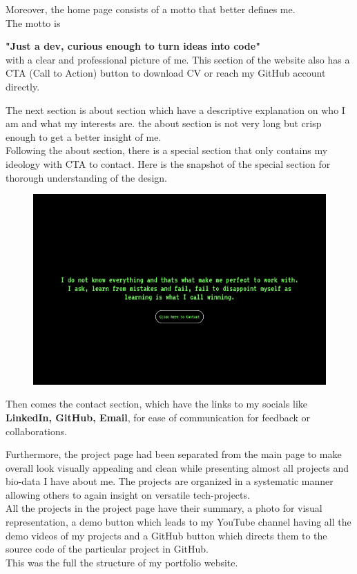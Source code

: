 \documentclass{report}
\begin{document}
Moreover, the home page consists of a motto that better defines me.\\
The motto is \par {\bf "Just a dev, curious enough to turn ideas into code"}\\ with a clear and professional picture of me. This section of the website also has a CTA (Call to Action) button to download CV or reach my GitHub account directly.\par
The next section is about section which have a descriptive explanation on who I am and what my interests are. the about section is not very long but crisp enough to get a better insight of me.\\
Following the about section, there is a special section that only contains my ideology with CTA to contact. Here is the snapshot of the special section for thorough understanding of the design.\\
\begin{figure}[h]
    \vspace{0.5cm}
    \centering
    \includegraphics[width=0.75\linewidth]{webshots/special.png}
    \vspace{0.5cm}
\end{figure}
Then comes the contact section, which have the links to my socials like {\bf LinkedIn, GitHub, Email}, for ease of communication for feedback or collaborations.\par
Furthermore, the project page had been separated from the main page to make overall look visually appealing and clean while presenting almost all projects and bio-data I have about me. The projects are organized in a systematic manner allowing others to again insight on versatile tech-projects.\\
All the projects in the project page have their summary, a photo for visual representation, a demo button which leads to my YouTube channel having all the demo videos of my projects and a GitHub button which directs them to the source code of the particular project in GitHub.\\ This was the full the structure of my portfolio website.
\end{document}
